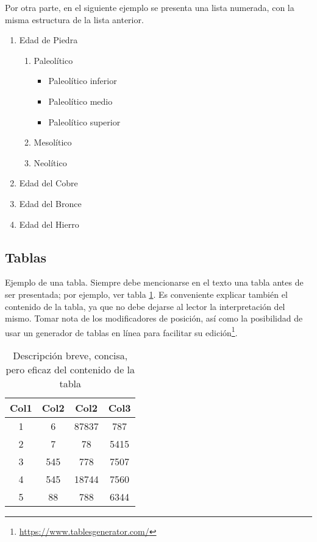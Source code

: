 Por otra parte, en el siguiente ejemplo se presenta una lista numerada, con la misma estructura de la lista anterior. 

\begin{enumerate}
\item Edad de Piedra
	\begin{enumerate}
	\item Paleolítico
		\begin{itemize}
		\item Paleolítico inferior
		\item Paleolítico medio
		\item Paleolítico superior
		\end{itemize}
	\item Mesolítico
	\item Neolítico
	\end{enumerate}
\item Edad del Cobre
\item Edad del Bronce
\item Edad del Hierro
\end{enumerate} 

\subsection{Tablas}
\label{sec:tablas}

Ejemplo de una tabla. Siempre debe mencionarse en el texto una tabla antes de ser presentada; por ejemplo, ver tabla \ref{tab:ejemplo}. Es conveniente explicar también el contenido de la tabla, ya que no debe dejarse al lector la interpretación del mismo. Tomar nota de los modificadores de posición, así como la posibilidad de usar un generador de tablas en línea para facilitar su edición\footnote{\url{https://www.tablesgenerator.com/}}.

\begin{table}[!ht]
\centering
\caption{Descripción breve, concisa, pero eficaz del contenido de la tabla} 
\label{tab:ejemplo}
\begin{tabular}{c c c c} 
\hline
Col1 & Col2 & Col2 & Col3 \\ [0.5ex] 
\hline\hline
1 & 6 & 87837 & 787 \\ 
2 & 7 & 78 & 5415 \\
3 & 545 & 778 & 7507 \\
4 & 545 & 18744 & 7560 \\
5 & 88 & 788 & 6344 \\ [1ex] 
\hline
\end{tabular}
\end{table}
 
